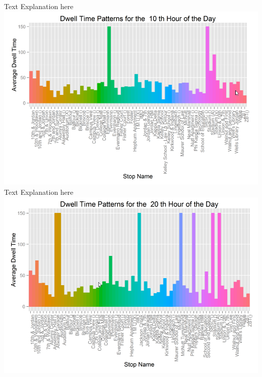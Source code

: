\documentclass[12pt]{article}
\begin{document}
Text Explanation here\\
\includegraphics[scale=0.6]{resources/ggplot4}\\[1cm] 
Text Explanation here\\
\includegraphics[scale=0.6]{resources/ggplot5}\\[1cm] 
\end{document}
